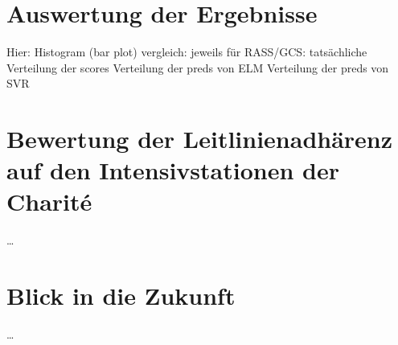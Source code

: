 \section{Auswertung der Ergebnisse}
Hier: Histogram (bar plot) vergleich: jeweils für RASS/GCS:
tatsächliche Verteilung der scores
Verteilung der preds von ELM
Verteilung der preds von SVR

\section{Bewertung der Leitlinienadhärenz auf den Intensivstationen der Charité}
\dots

\section{Blick in die Zukunft}
\dots

